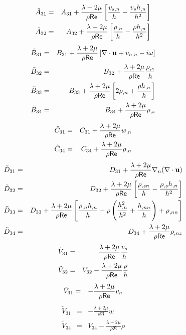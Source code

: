 \bigskip
{}
\begin{eqnarray}
  \tilde A_{31} &=& A_{31} + \frac{\lambda + 2 \mu}{\rho {\sf Re}} 
                    \left[ \frac{v_{s,n}}{h} - \frac{{v_s}h_{,n}}{h^2} \right] \\
  \tilde A_{32} &=& A_{32} + \frac{\lambda + 2 \mu}{\rho {\sf Re}}
                    \left[ \frac{\rho_{,n}}{h} - \frac{\rho h_{,n}}{h^2} \right]
\end{eqnarray}
%
\begin{eqnarray}
  \tilde B_{31} &=& B_{31} + \frac{\lambda + 2 \mu}{\rho {\sf Re}} 
                    \left[ {\nabla \cdot {\bf u}} + v_{n,n} - i\omega \right] \\
  \tilde B_{32} &=& B_{32} + \frac{\lambda + 2 \mu}{\rho {\sf Re}}
                    \frac{\rho_{,s}}{h} \\
  \tilde B_{33} &=& B_{33} + \frac{\lambda + 2 \mu}{\rho {\sf Re}}
                    \left[ 2 \rho_{,n} + \frac{\rho h_{,n}}{h} \right] \\
  \tilde B_{34} &=& B_{34} + \frac{\lambda + 2 \mu}{\rho {\sf Re}} \rho_{,z}
\end{eqnarray}
%
\begin{eqnarray}
  \tilde C_{31} &=& C_{31} + \frac{\lambda + 2 \mu}{\rho {\sf Re}} w_{,n} \\
  \tilde C_{34} &=& C_{34} + \frac{\lambda + 2 \mu}{\rho {\sf Re}} \rho_{,n}
\end{eqnarray}
%
\begin{eqnarray}
  \tilde D_{31} &=& D_{31} + \frac{\lambda + 2 \mu}{\rho {\sf Re}} 
                    \nabla_n (\nabla \cdot {\bf u}) \\
  \tilde D_{32} &=& D_{32} + \frac{\lambda + 2 \mu}{\rho {\sf Re}}
                    \left[ \frac{\rho_{,sn}}{h} - \frac{\rho_{,s}h_{,n}}{h^2}
                    \right] \\
  \tilde D_{33} &=& D_{33} + \frac{\lambda + 2 \mu}{\rho {\sf Re}}
                    \left[ \frac{\rho_{,n}h_{,n}}{h} - \rho 
                    \left( \frac{h_{,n}^2}{h^2} + \frac{h_{,nn}}{h} \right) +
                    \rho_{,nn} \right] \\
  \tilde D_{34} &=& D_{34} + \frac{\lambda + 2 \mu}{\rho {\sf Re}} \rho_{,nz}
\end{eqnarray}
%
\begin{eqnarray} 
  \tilde V_{31} &=& -\frac{\lambda + 2 \mu}{\rho {\sf Re}} \frac{{v_s}}{h}\\
  \tilde V_{32} &=& V_{32} - \frac{\lambda + 2 \mu}{\rho {\sf Re}} \frac{\rho}{h}
\end{eqnarray}
%
\begin{eqnarray} 
  \tilde V_{31} &=& -\frac{\lambda + 2 \mu}{\rho {\sf Re}} {v_n}
\end{eqnarray}
%
\begin{eqnarray} 
  \tilde V_{31} &=& -\frac{\lambda + 2 \mu}{\rho \Re} w \\
  \tilde V_{34} &=& V_{34} - \frac{\lambda + 2 \mu}{\rho \Re} \rho
\end{eqnarray}

